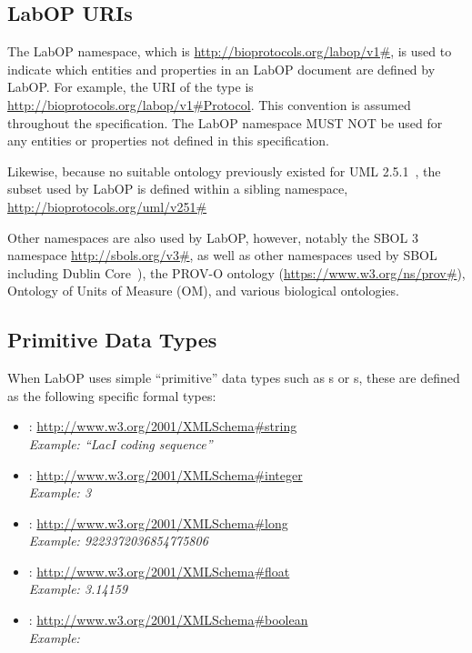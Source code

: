 \subsection{LabOP URIs}
 \label{sec:labopURIs}
  

The LabOP namespace, which is \url{http://bioprotocols.org/labop/v1\#}, is used to indicate which entities and properties in an LabOP document are defined by LabOP. 
For example, the URI of the type  is \url{http://bioprotocols.org/labop/v1\#Protocol}. 
This convention is assumed throughout the specification.
The LabOP namespace MUST NOT be used for any entities or properties not defined in this specification.

Likewise, because no suitable ontology previously existed for UML 2.5.1~\citep{uml251}, the subset used by LabOP is defined within a sibling namespace, \url{http://bioprotocols.org/uml/v251\#}

Other namespaces are also used by LabOP, however, notably the SBOL 3 namespace \url{http://sbols.org/v3\#}, as well as other namespaces used by SBOL including Dublin Core~\citep{dcmi2012}), the PROV-O ontology (\url{https://www.w3.org/ns/prov#}), Ontology of Units of Measure (OM), and various biological ontologies.


\subsection{Primitive Data Types}
\label{sec:datatypes}
\label{sec:string}
\label{sec:integer}
\label{sec:long}
\label{sec:float}
\label{sec:boolean}
\label{sec:URI}
\label{sec:literal}

When LabOP uses simple ``primitive'' data types such as s or s, these are defined as the following specific formal types:
\begin{itemize}
\item {}: \url{http://www.w3.org/2001/XMLSchema\#string}\\
  {\em Example: ``LacI coding sequence''}
\item {}: \url{http://www.w3.org/2001/XMLSchema\#integer}\\
  {\em Example: 3}
\item {}: \url{http://www.w3.org/2001/XMLSchema\#long}\\
  {\em Example: 9223372036854775806}
\item {}: \url{http://www.w3.org/2001/XMLSchema\#float}\\
  {\em Example: 3.14159}
\item {}: \url{http://www.w3.org/2001/XMLSchema\#boolean}\\
  {\em Example: }
\end{itemize}

